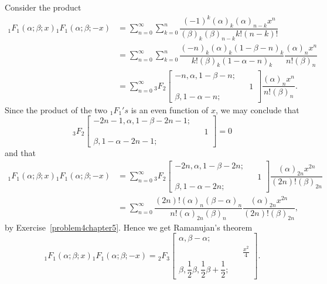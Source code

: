 \begin{solution}
Consider the product
$$\begin{array}{ll}
{}_1F_1(\alpha; \beta; x) {}_1F_1(\alpha; \beta; -x) &= \displaystyle\sum_{n=0}^{\infty} \displaystyle\sum_{k=0}^{n} \dfrac{(-1)^k (\alpha)_k (\alpha)_{n-k} x^n}{(\beta)_k (\beta)_{n-k} k! (n-k)!} \\
&= \displaystyle\sum_{n=0}^{\infty} \displaystyle\sum_{k=0}^n \dfrac{(-n)_k (\alpha)_k (1 - \beta - n)_k}{k! (\beta)_k (1 - \alpha - n)_k} \dfrac{(\alpha)_n x^n}{n! (\beta)_n} \\
&= \displaystyle\sum_{n=0}^{\infty} {}_3F_2 \left[ \begin{array}{rlr}
-n, \alpha, 1-\beta-n; & & \\
& & 1 \\
\beta, 1-\alpha - n; & &
\end{array} \right] \dfrac{(\alpha)_n x^n}{n! (\beta)_n}.
\end{array}$$
Since the product of the two ${}_1F_1's$ is an even function of $x$, we may conclude that
$${}_3F_2 \left[ \begin{array}{rlr}
-2n-1, \alpha, 1-\beta-2n-1; & & \\
& & 1 \\
\beta, 1-\alpha-2n-1; & & 
\end{array} \right] = 0$$
and that 
$$\begin{array}{ll}
{}_1F_1(\alpha;\beta;x) {}_1F_1(\alpha; \beta; -x) &= \displaystyle\sum_{n=0}^{\infty} {}_3F_2 \left[ \begin{array}{rlr}
-2n, \alpha, 1-\beta-2n; & & \\
& & 1 \\
\beta, 1-\alpha-2n; & & 
\end{array} \right] \dfrac{(\alpha)_{2n} x^{2n}}{(2n)!(\beta)_{2n}} \\
&= \displaystyle\sum_{n=0}^{\infty} \dfrac{(2n)! (\alpha)_n (\beta - \alpha)_n}{n! (\alpha)_{2n} (\beta)_n} \dfrac{(\alpha)_{2n} x^{2n}}{(2n)! (\beta)_{2n}},
\end{array}$$
by Exercise~\ref{problem4chapter5}. Hence we get Ramanujan's theorem
$${}_1F_1(\alpha;\beta;x) {}_1F_1(\alpha; \beta; -x) = {}_2F_3 \left[ \begin{array}{rlr}
\alpha, \beta - \alpha; & & \\
& & \frac{x^2}{4} \\
\beta, \dfrac{1}{2} \beta, \dfrac{1}{2} \beta + \dfrac{1}{2};
\end{array} \right].$$
\end{solution}
